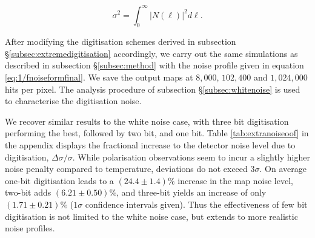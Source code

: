 \documentclass[apj]{emulateapj}
\newcommand{\changed}[1]{\textcolor{Red}{#1}}
\begin{document}
\begin{equation} \label{eq:psvl1/f}
\sigma^2 = \int_0^\infty \left| N(\ell) \right|^2 d\ell.
\end{equation}

After modifying the digitisation schemes derived in subsection \S\ref{subsec:extremedigitisation} accordingly, we carry out the same simulations as described in subsection \S\ref{subsec:method} with the noise profile given in equation \ref{eq:1/fnoiseformfinal}. We save the output maps at $8,000$, $102,400$ and $1,024,000$ hits per pixel. The analysis procedure of subsection \S\ref{subsec:whitenoise} is used to characterise the digitisation noise.


We recover similar results to the white noise case, with three bit digitisation performing the best, followed by two bit, and one bit. Table \ref{tab:extranoiseoof} in the appendix displays the fractional increase to the detector noise level due to digitisation, $\Delta \sigma / \sigma$. While polarisation observations seem to incur a slightly higher noise penalty compared to temperature, deviations do not exceed $3\sigma$. On average one-bit digitisation leads to a $(24.4\pm 1.4)\%$ increase in the map noise level, two-bit adds $(6.21\pm0.50)\%$, and three-bit yields an increase of only $(1.71\pm0.21)\%$ ($1\sigma$ confidence intervals given). Thus the effectiveness of few bit digitisation is not limited to the white noise case, but extends to more realistic noise profiles.

\end{document}

